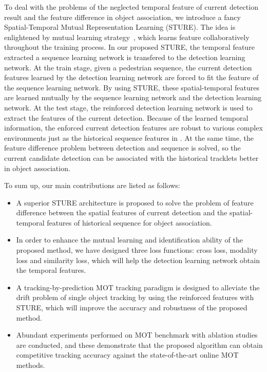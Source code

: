 \documentclass[times,twocolumn,final,authoryear]{elsarticle}
\begin{document}
To deal with the problems of the neglected temporal feature of current detection result and the feature difference in object association, we introduce a fancy Spatial-Temporal Mutual Representation Learning (STURE). 
The idea is enlightened by mutual learning strategy~\citep{RN983}, which learns feature collaboratively throughout the training process. 
{
In our proposed STURE, the temporal feature extracted a sequence learning network is transfered to the detection learning network.}
At the train stage, given a pedestrian sequence, the current detection features learned by the detection learning network are forced to fit the feature of the sequence learning network. 
By using STURE, these spatial-temporal features are learned mutually by the sequence learning network and the detection learning network. 
At the test stage, the reinforced detection learning network is used to extract the features of the current detection. 
Because of the learned temporal information, the enforced current detection features are robust to various complex environments just as the historical sequence features in .
At the same time, the feature difference problem between detection and sequence is solved, so the current candidate detection can be associated with the historical tracklets better in object association.

To sum up, our main contributions are listed as follows: 

\begin{itemize} 
	\item A superior STURE architecture is proposed to solve the problem of feature difference between the spatial features of current detection and the spatial-temporal features of historical sequence for object association.
	\item In order to enhance the mutual learning and identification ability of the proposed method, we have designed three loss functions: cross loss, modality loss and similarity loss, which will help the detection learning network obtain the temporal features. 
	\item A tracking-by-prediction MOT tracking paradigm is designed to alleviate the drift problem of single object tracking by using the reinforced features with STURE, which will improve the accuracy and robustness of the proposed method. 
	\item Abundant experiments performed on MOT benchmark with ablation studies are conducted, and these demonstrate that the proposed algorithm can obtain competitive tracking accuracy against the state-of-the-art online MOT methods.
\end{itemize}
\end{document}
